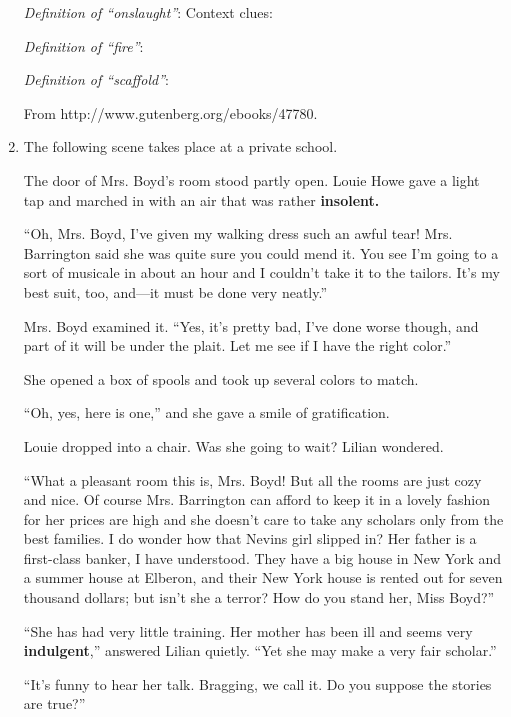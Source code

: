 \begin{enumerate}
\textit{Definition of ``onslaught''}: \hrulefill
Context clues: \hrulefill

\textit{Definition of ``fire''}: \hrulefill

\hrulefill

\textit{Definition of ``scaffold''}: \hrulefill

\hrulefill

From http://www.gutenberg.org/ebooks/47780. 

\item The following scene takes place at a private school.

\begin{linenumbers}
\modulolinenumbers[5]
The door of Mrs. Boyd’s room stood partly open. Louie Howe gave a light tap and marched in with an air that was rather \textbf{insolent.}

``Oh, Mrs. Boyd, I’ve given my walking dress such an awful tear! Mrs. Barrington said she was quite sure you could mend it. You see I’m going to a sort of musicale in about an hour and I couldn’t take it to the tailors. It’s my best suit, too, and—it must be done very neatly.''

Mrs. Boyd examined it. ``Yes, it’s pretty bad, I’ve done worse though, and part of it will be under the plait. Let me see if I have the right color.''

She opened a box of spools and took up several colors to match.

``Oh, yes, here is one,'' and she gave a smile of gratification.

Louie dropped into a chair. Was she going to wait? Lilian wondered.

``What a pleasant room this is, Mrs. Boyd! But all the rooms are just cozy and nice. Of course Mrs. Barrington can afford to keep it in a lovely fashion for her prices are high and she doesn’t care to take any scholars only from the best families. I do wonder how that Nevins girl slipped in? Her father is a first-class banker, I have understood. They have a big house in New York and a summer house at Elberon, and their New York house is rented out for seven thousand dollars; but isn’t she a terror? How do you stand her, Miss Boyd?''

``She has had very little training. Her mother has been ill and seems very \textbf{indulgent},'' answered Lilian quietly. ``Yet she may make a very fair scholar.''

``It’s funny to hear her talk. Bragging, we call it. Do you suppose the stories are true?''


\end{linenumbers}
\end{enumerate}
